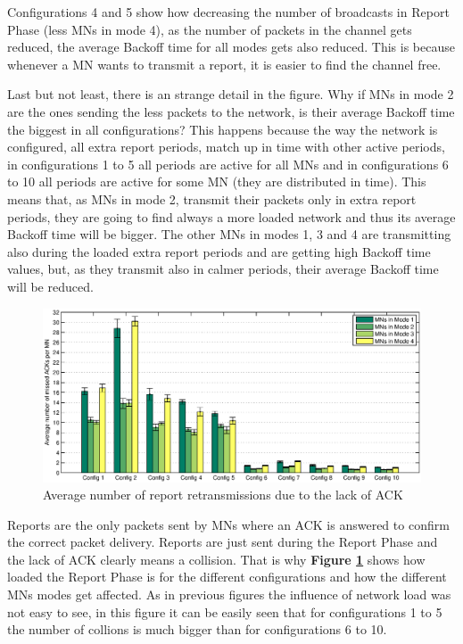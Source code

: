 Configurations 4 and 5 show how decreasing the number of broadcasts in Report Phase (less \acp{MN} in mode 4), as the number of packets in the channel
gets reduced, the average Backoff time for all modes gets also reduced. This is because whenever a \ac{MN} wants to transmit a report, it is easier to 
find the channel free.

Last but not least, there is an strange detail in the figure. Why if \acp{MN} in mode 2 are the ones sending the less packets to the network, is their 
average Backoff time the biggest in all configurations? This happens because the way the network is configured, all extra report periods, match up in time
with other active periods, in configurations 1 to 5 all periods are active for all \acp{MN} and in configurations 6 to 10 all periods are active for 
some \ac{MN} (they are distributed in time). This means that, as \acp{MN} in mode 2, transmit their packets only in extra report periods, they are going to 
find always a more loaded network and thus its average Backoff time will be bigger. The other \acp{MN} in modes 1, 3 and 4 are transmitting  
also during the loaded extra report periods and are getting high Backoff time values, but, as they transmit also in calmer periods, their average Backoff time will be reduced.

\begin{figure}[ht]
 \begin{center}
  \includegraphics[width=1\textwidth]{nbMissedACKMN.eps}
 \end{center}
 \caption{Average number of report retransmissions due to the lack of ACK}
 \label{fig:nbMissedACKMN}
\end{figure}

Reports are the only packets sent by \acp{MN} where an \ac{ACK} is answered to confirm the correct packet delivery. Reports are just sent during the
Report Phase and the lack of \ac{ACK} clearly means a collision. That is why \textbf{Figure \ref{fig:nbMissedACKMN}} shows how loaded the Report Phase is
for the different configurations and how the different \acp{MN} modes get affected. As in previous figures the influence of network load was not easy to
see, in this figure it can be easily seen that for configurations 1 to 5 the number of collions is much bigger than for configurations 6 to 10.

